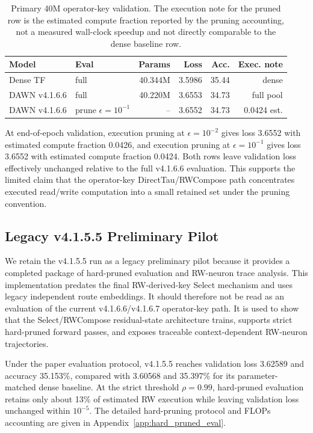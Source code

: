 \documentclass{article}
\begin{document}
\begin{table}[t]
\centering
\footnotesize
\setlength{\tabcolsep}{3pt}
\renewcommand{\arraystretch}{1.04}
\begin{tabular}{llrrrr}
\toprule
Model & Eval & Params & Loss & Acc. & Exec. note \\
\midrule
Dense TF & full & 40.344M & 3.5986 & 35.44 & dense \\
DAWN v4.1.6.6 & full & 40.220M & 3.6553 & 34.73 & full pool \\
DAWN v4.1.6.6 & prune $\epsilon=10^{-1}$ & -- & 3.6552 & 34.73 & 0.0424 est. \\
\bottomrule
\end{tabular}
\caption{Primary 40M operator-key validation. The execution note for the pruned row is the estimated compute fraction reported by the pruning accounting, not a measured wall-clock speedup and not directly comparable to the dense baseline row.}
\label{tab:v4166_main}
\end{table}

At end-of-epoch validation, execution pruning at \(\epsilon=10^{-2}\) gives loss 3.6552 with estimated compute fraction 0.0426, and execution pruning at \(\epsilon=10^{-1}\) gives loss 3.6552 with estimated compute fraction 0.0424. Both rows leave validation loss effectively unchanged relative to the full v4.1.6.6 evaluation. This supports the limited claim that the operator-key DirectTau/RWCompose path concentrates executed read/write computation into a small retained set under the pruning convention.

\subsection{Legacy v4.1.5.5 Preliminary Pilot}
\label{sec:legacy_v4155_pilot}

We retain the v4.1.5.5 run as a legacy preliminary pilot because it provides a completed package of hard-pruned evaluation and RW-neuron trace analysis. This implementation predates the final RW-derived-key Select mechanism and uses legacy independent route embeddings. It should therefore not be read as an evaluation of the current v4.1.6.6/v4.1.6.7 operator-key path. It is used to show that the Select/RWCompose residual-state architecture trains, supports strict hard-pruned forward passes, and exposes traceable context-dependent RW-neuron trajectories.

Under the paper evaluation protocol, v4.1.5.5 reaches validation loss 3.62589 and accuracy 35.153\%, compared with 3.60568 and 35.397\% for its parameter-matched dense baseline. At the strict threshold \(\rho=0.99\), hard-pruned evaluation retains only about 13\% of estimated RW execution while leaving validation loss unchanged within \(10^{-5}\). The detailed hard-pruning protocol and FLOPs accounting are given in Appendix~\ref{app:hard_pruned_eval}.
\end{document}
